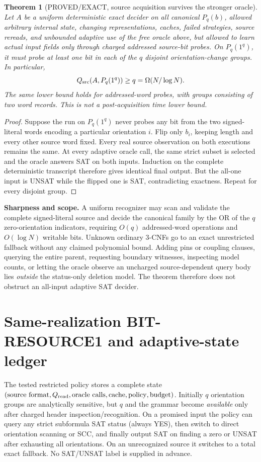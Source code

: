 \documentclass[11pt]{article}
\newtheorem{theorem}{Theorem}
\begin{document}
\begin{theorem}[PROVED/EXACT, source acquisition survives the stronger oracle]
Let \(A\) be a uniform deterministic exact decider on all canonical \(P_q(b)\), allowed arbitrary internal state, changing representations, caches, failed strategies, source rereads, and \emph{unbounded adaptive} use of the free oracle above, but allowed to learn actual input fields only through charged addressed source-bit probes. On \(P_q(1^q)\), it must probe at least one bit in each of the \(q\) disjoint orientation-change groups. In particular,
\[
Q_{\rm src}(A,P_q(1^q))\ge q=\Omega(N/\log N).
\]
The same lower bound holds for addressed-word probes, with groups consisting of two word records. This is \emph{not} a post-acquisition time lower bound.
\end{theorem}
\begin{proof}
Suppose the run on \(P_q(1^q)\) never probes any bit from the two signed-literal words encoding a particular orientation \(i\). Flip only \(b_i\), keeping length and every other source word fixed. Every real source observation on both executions remains the same. At every adaptive oracle call, the same strict subset is selected and the oracle answers SAT on both inputs. Induction on the complete deterministic transcript therefore gives identical final output. But the all-one input is UNSAT while the flipped one is SAT, contradicting exactness. Repeat for every disjoint group.
\end{proof}

\noindent\textbf{Sharpness and scope.}
A uniform recognizer may scan and validate the complete signed-literal source and decide the canonical family by the OR of the \(q\) zero-orientation indicators, requiring \(O(q)\) addressed-word operations and \(O(\log N)\) writable bits. Unknown ordinary 3-CNFs go to an exact unrestricted fallback without any claimed polynomial bound. Adding pins or coupling clauses, querying the entire parent, requesting boundary witnesses, inspecting model counts, or letting the oracle observe an uncharged source-dependent query body lies \emph{outside} the status-only deletion model. The theorem therefore does not obstruct an all-input adaptive SAT decider.

\section{Same-realization BIT-RESOURCE1 and adaptive-state ledger}
The tested restricted policy stores a complete state \((\mathrm{source\ format},Q_{\rm read},\mathrm{oracle\ calls},\mathrm{cache},\mathrm{policy},\mathrm{budget})\). Initially \(q\) orientation groups are analytically sensitive, but \(q\) and the grammar become \emph{available} only after charged header inspection/recognition. On a promised input the policy can query any strict subformula SAT status (always YES), then switch to direct orientation scanning or SCC, and finally output SAT on finding a zero or UNSAT after exhausting all orientations. On an unrecognized source it switches to a total exact fallback. No SAT/UNSAT label is supplied in advance.
\end{document}
